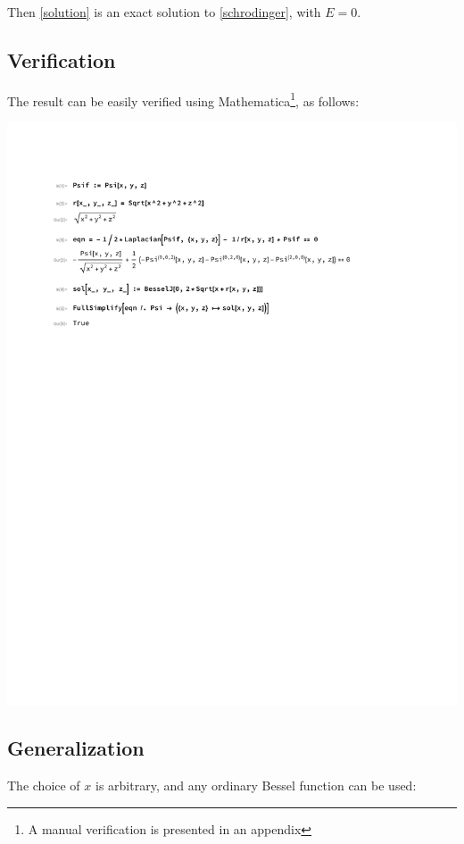 \documentclass{article}
\begin{document}
\vskip 12pt

Then \eqref{solution} is an exact solution to \eqref{schrodinger}, with $E=0$.

\subsection*{Verification}

The result can be easily verified using Mathematica\footnote{A manual verification is presented in an appendix}, as follows:

\includegraphics[page=1, clip, trim=1in 7in 1in 1in, width=\textwidth]{improved.pdf}

\subsection*{Generalization}
\parskip 12pt

The choice of $x$ is arbitrary, and any ordinary Bessel function can be used:
\end{document}
